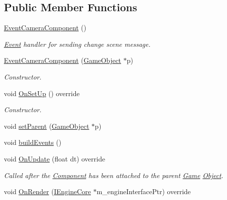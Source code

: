 \subsection*{Public Member Functions}
\begin{DoxyCompactItemize}
\item 
\hypertarget{class_event_camera_component_abc07b7411c3fc4976b9b1c2d986cfbfc}{\hyperlink{class_event_camera_component_abc07b7411c3fc4976b9b1c2d986cfbfc}{Event\+Camera\+Component} ()}\label{class_event_camera_component_abc07b7411c3fc4976b9b1c2d986cfbfc}

\begin{DoxyCompactList}\small\item\em \hyperlink{class_event}{Event} handler for sending change scene message. \end{DoxyCompactList}\item 
\hypertarget{class_event_camera_component_ac4fb242d4e7c859481e520bd990e7f3d}{\hyperlink{class_event_camera_component_ac4fb242d4e7c859481e520bd990e7f3d}{Event\+Camera\+Component} (\hyperlink{class_game_object}{Game\+Object} $\ast$p)}\label{class_event_camera_component_ac4fb242d4e7c859481e520bd990e7f3d}

\begin{DoxyCompactList}\small\item\em Constructor. \end{DoxyCompactList}\item 
void \hyperlink{class_event_camera_component_a603f483159f572389fd4f507e8cde88c}{On\+Set\+Up} () override
\begin{DoxyCompactList}\small\item\em Constructor. \end{DoxyCompactList}\item 
void \hyperlink{class_event_camera_component_af7f1cde6285041f3d33707c52c52261e}{set\+Parent} (\hyperlink{class_game_object}{Game\+Object} $\ast$p)
\item 
void \hyperlink{class_event_camera_component_a6a2c0f4293f3f7d35296c9e00709ad40}{build\+Events} ()
\item 
void \hyperlink{class_event_camera_component_aa834641aeb7cc8ae509f6cc997a44c99}{On\+Update} (float dt) override
\begin{DoxyCompactList}\small\item\em Called after the \hyperlink{class_component}{Component} has been attached to the parent \hyperlink{class_game}{Game} \hyperlink{class_object}{Object}. \end{DoxyCompactList}\item 
\hypertarget{class_event_camera_component_a88ef296a079e3021d756ef03c56cfe70}{void \hyperlink{class_event_camera_component_a88ef296a079e3021d756ef03c56cfe70}{On\+Render} (\hyperlink{class_i_engine_core}{I\+Engine\+Core} $\ast$m\+\_\+engine\+Interface\+Ptr) override}\label{class_event_camera_component_a88ef296a079e3021d756ef03c56cfe70}


\end{DoxyCompactItemize}
